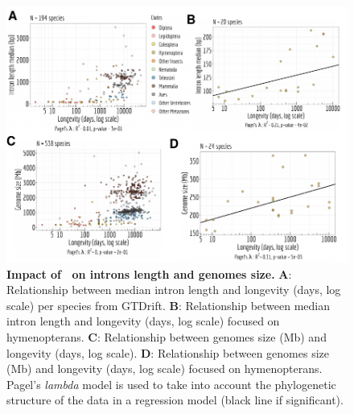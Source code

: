 \begin{figure}[t]
    \centering                                                                            
    \includegraphics[width=\textwidth] {figures/Appen_C2.pdf}                                   
     \caption[Impact of \Ne~on introns length and genomes size]{\textbf{Impact of \Ne~on introns length and genomes size.} \textbf{A}: Relationship between median intron length and longevity (days, log scale) per species from GTDrift. \textbf{B}: Relationship between median intron length and longevity (days, log scale) focused on hymenopterans. \textbf{C}: Relationship between genomes size (Mb) and longevity (days, log scale). \textbf{D}: Relationship between genomes size (Mb) and longevity (days, log scale) focused on hymenopterans. 
     Pagel's \textit{lambda} model is used to take into account the phylogenetic structure of the data in a regression model (black line if significant).} 
    \label{suppfig:AppC2}
\end{figure}